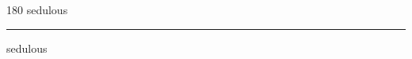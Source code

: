 
\begin{frame}
\begin{center}
\begin{turn}{180}
{\fontsize{2.5cm}{1em}\selectfont sedulous}
\end{turn}
\vspace{1em}\par  
\hrule
\vspace{1em}\par  
{\fontsize{2.5cm}{1em}\selectfont sedulous}
\end{center}
\end{frame}
